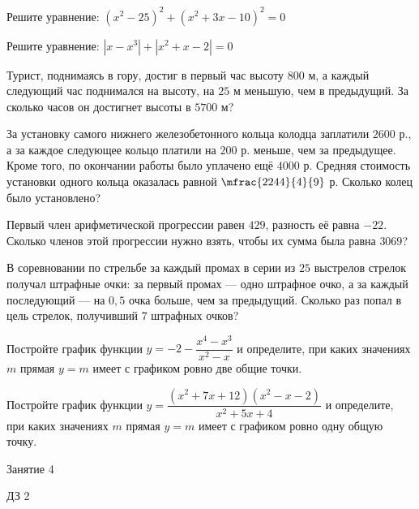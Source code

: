 \begin{class}[number=3]
	\begin{listofex}
		\item Решите уравнение: \quad \( (x^2-25)^2+(x^2+3x-10)^2=0 \)
		\item Решите уравнение: \quad \( |x-x^3|+|x^2+x-2|=0 \)
		\item Турист, поднимаясь в гору, достиг в первый час высоту \( 800 \) м, а каждый следующий час поднимался на высоту, на \( 25 \) м меньшую, чем в предыдущий. За сколько часов он достигнет высоты в \( 5700 \) м?
		\item За установку самого нижнего железобетонного кольца колодца заплатили \( 2600 \) р., а за каждое следующее кольцо платили на \( 200 \) р. меньше, чем за предыдущее. Кроме того, по окончании работы было уплачено ещё \( 4000 \) р. Средняя стоимость установки одного кольца оказалась равной \( \mfrac{2244}{4}{9} \) р. Сколько колец было установлено?
		\item Первый член арифметической прогрессии равен \( 429 \), разность её равна \( -22 \). Сколько членов этой прогрессии нужно взять, чтобы их сумма была равна \( 3069 \)?
		\item В соревновании по стрельбе за каждый промах в серии из \( 25 \) выстрелов стрелок получал штрафные очки: за первый промах --- одно штрафное очко, а за каждый последующий --- на \( 0,5 \) очка больше, чем за предыдущий. Сколько раз попал в цель стрелок, получивший \( 7 \) штрафных очков?
		\item Постройте график функции \( y=-2-\dfrac{x^4-x^3}{x^2-x} \) и определите, при каких значениях \( m \) прямая \( y=m \) имеет с графиком ровно две общие точки.
		\item Постройте график функции \( y=\dfrac{(x^2+7x+12)(x^2-x-2)}{x^2+5x+4} \) и определите, при каких значениях \( m \) прямая \( y=m \) имеет с графиком ровно одну общую точку.
	\end{listofex}
\end{class}

\begin{class}[number=4]
	\begin{listofex}
		\item Занятие 4
	\end{listofex}
\end{class}

\begin{homework}[number=2]
	\begin{listofex}
		\item ДЗ 2
	\end{listofex}
\end{homework}

